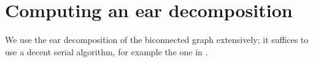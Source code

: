 \section{Computing an ear decomposition}
\label{ED}
We use the ear decomposition of the biconnected graph extensively;
it suffices to use a decent serial algorithm, for example the one
in \cite{schmidt13}.
